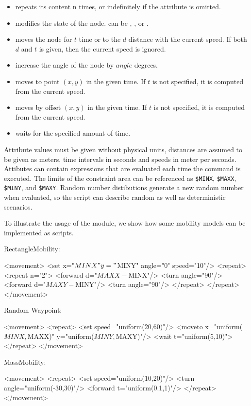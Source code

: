\begin{itemize}
\item {} repeats its content n times, or indefinitely if
       the  attribute is omitted.
\item {} modifies the state of the node.
       can be , , 
      or .
\item {} moves the node for $t$ time or to the $d$ distance
      with the current speed. If both $d$ and $t$ is given, then the current
      speed is ignored.
\item {} increase the angle of the node by $angle$ degrees.
\item {} moves to point $(x,y)$ in the given time. If
      $t$ is not specified, it is computed from the current speed.
\item {} moves by offset $(x,y)$ in the given time. If
      $t$ is not specified, it is computed from the current speed.
\item {} waits for the specified amount of time.
\end{itemize}

Attribute values must be given without physical units, distances are assumed
to be given as meters, time intervals in seconds and speeds in meter per seconds.
Attibutes can contain expressions that are evaluated each time the
command is executed. The limits of the constraint area can be
referenced as \verb!$MINX!, \verb!$MAXX!, \verb!$MINY!, and \verb!$MAXY!.
Random number distibutions generate a new random number when evaluated,
so the script can describe random as well as deterministic scenarios.

To illustrate the usage of the module, we show how some mobility
models can be implemented as scripts.

RectangleMobility:

\begin{XML}
<movement>
    <set x="$MINX" y="$MINY" angle="0" speed="10"/>
    <repeat>
        <repeat n="2">
            <forward d="$MAXX-$MINX"/>
            <turn angle="90"/>
            <forward d="$MAXY-$MINY"/>
            <turn angle="90"/>
        </repeat>
    </repeat>
</movement>
\end{XML}

Random Waypoint:

\begin{XML}
<movement>
    <repeat>
        <set speed="uniform(20,60)"/>
        <moveto x="uniform($MINX,$MAXX)" y="uniform($MINY,$MAXY)"/>
        <wait t="uniform(5,10)">
    </repeat>
</movement>
\end{XML}

MassMobility:

\begin{XML}
<movement>
    <repeat>
        <set speed="uniform(10,20)"/>
        <turn angle="uniform(-30,30)"/>
        <forward t="uniform(0.1,1)"/>
    </repeat>
</movement>
\end{XML}




